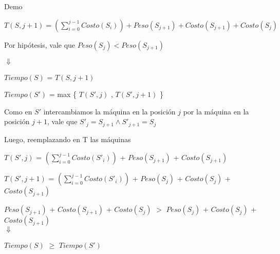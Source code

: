 \begin{subsubsection}{Demo}
\begin{center}
$T(S,j+1) = \left(\displaystyle\sum\limits_{i=0}^{j-1} Costo(S_i) \right) + Peso(S_{j+1}) + Costo(S_{j+1}) + Costo(S_j)$

Por hipótesis, vale que $Peso(S_j) < Peso(S_{j+1})$

$\Downarrow$


$Tiempo(S)$ = $T(S,j+1)$
\end{center}



\begin{center}
$Tiempo(S')$ = max \{ $T(S',j)$ , $T(S',j+1)$ \}


Como en $S'$ intercambiamos la máquina en la posición $j$ por la máquina en la posición $j + 1$, vale que $S'_j = S_{j+1} \wedge S'_{j + 1} = S_j$

Luego, reemplazando en T las máquinas

$T(S',j)$ = $\left(\displaystyle\sum\limits_{i=0}^{j-1} Costo(S'_i) \right)$ + $Peso(S_{j+1})$ + $Costo(S_{j+1})$

$T(S',j+1)$ = $\left(\displaystyle\sum\limits_{i=0}^{j-1} Costo(S'_i) \right)$ + $Peso(S_j)$ + $Costo(S_j)$ + $Costo(S_{j+1})$

\end{center}

\begin{center}

$Peso(S_{j+1})$ + $Costo(S_{j+1})$ + $Costo(S_j)$ $>$ $Peso(S_j)$ + $Costo(S_j)$ + $Costo(S_{j+1})$\\
$\Downarrow $

$Tiempo(S)$ $\geq$ $Tiempo(S')$\\

\end{center}

\end{subsubsection}
